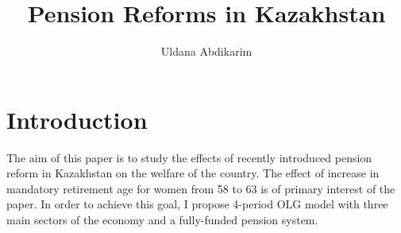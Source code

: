 \documentclass[pdflatex]{beamer}
\title[Pension Reforms]{Pension Reforms in Kazakhstan}
\author[Abdikarim]{Uldana Abdikarim}
\institute[JHU]{Johns Hopkins University}
\begin{document}


\begin{frame}[plain]
  \titlepage
\end{frame}


\section{Introduction}

The aim of this paper is to study the effects of recently introduced pension reform in Kazakhstan on the welfare of the country. The effect of increase in mandatory retirement age for women from 58 to 63 is of primary interest of the paper. In order to achieve this goal, I propose 4-period OLG model with three main sectors of the economy and a fully-funded pension system. 
\end{document}
